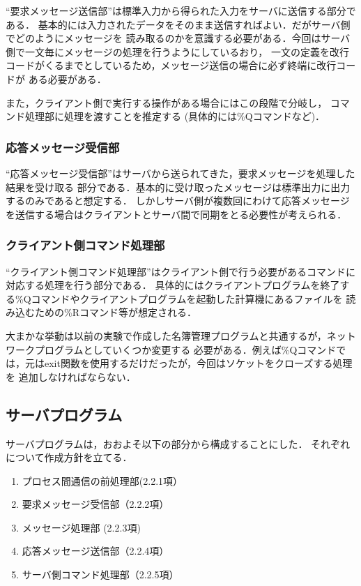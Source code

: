 \documentclass[a4paper,11pt]{jarticle}
\begin{document}
``要求メッセージ送信部''は標準入力から得られた入力をサーバに送信する部分である．
基本的には入力されたデータをそのまま送信すればよい．だがサーバ側でどのようにメッセージを
読み取るのかを意識する必要がある．今回はサーバ側で一文毎にメッセージの処理を行うようにしているおり，
一文の定義を改行コードがくるまでとしているため，メッセージ送信の場合に必ず終端に改行コードが
ある必要がある．

また，クライアント側で実行する操作がある場合にはこの段階で分岐し，
コマンド処理部に処理を渡すことを推定する
(具体的には\%Qコマンドなど)．

\subsubsection{応答メッセージ受信部} \label{sec:recv}

``応答メッセージ受信部''はサーバから送られてきた，要求メッセージを処理した結果を受け取る
部分である．基本的に受け取ったメッセージは標準出力に出力するのみであると想定する．
しかしサーバ側が複数回にわけて応答メッセージを送信する場合はクライアントとサーバ間で同期をとる必要性が考えられる．


\subsubsection{クライアント側コマンド処理部} \label{sec:command}

``クライアント側コマンド処理部''はクライアント側で行う必要があるコマンドに対応する処理を行う部分である．
具体的にはクライアントプログラムを終了する\%Qコマンドやクライアントプログラムを起動した計算機にあるファイルを
読み込むための\%Rコマンド等が想定される．

大まかな挙動は以前の実験で作成した名簿管理プログラムと共通するが，ネットワークプログラムとしていくつか変更する
必要がある．例えば\%Qコマンドでは，元はexit関数を使用するだけだったが，今回はソケットをクローズする処理を
追加しなければならない．


\subsection{サーバプログラム}
サーバプログラムは，おおよそ以下の部分から構成することにした．
それぞれについて作成方針を立てる．
\begin{enumerate}
\setlength{\parskip}{2pt} \setlength{\itemsep}{2pt}
    \item プロセス間通信の前処理部(2.2.1項）
    \item 要求メッセージ受信部（2.2.2項）
    \item メッセージ処理部 (2.2.3項)
    \item 応答メッセージ送信部（2.2.4項）
    \item サーバ側コマンド処理部（2.2.5項）
\end{enumerate}
\end{document}
